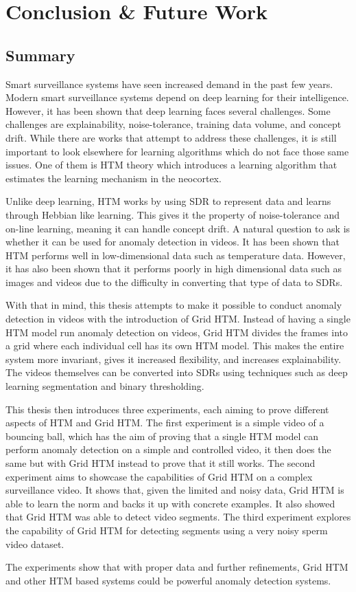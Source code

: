 \chapter{Conclusion \& Future Work}
\label{sec:conclusion}
\section{Summary}
Smart surveillance systems have seen increased demand in the past few years. Modern smart surveillance systems depend on deep learning for their intelligence. However, it has been shown that deep learning faces several challenges. Some challenges are explainability, noise-tolerance, training data volume, and concept drift. While there are works that attempt to address these challenges, it is still important to look elsewhere for learning algorithms which do not face those same issues. One of them is HTM theory which introduces a learning algorithm that estimates the learning mechanism in the neocortex.
\par
Unlike deep learning, HTM works by using SDR to represent data and learns through Hebbian like learning. This gives it the property of noise-tolerance and on-line learning, meaning it can handle concept drift. A natural question to ask is whether it can be used for anomaly detection in videos. It has been shown that HTM performs well in low-dimensional data such as temperature data. However, it has also been shown that it performs poorly in high dimensional data such as images and videos due to the difficulty in converting that type of data to SDRs.
\par
With that in mind, this thesis attempts to make it possible to conduct anomaly detection in videos with the introduction of Grid HTM. Instead of having a single HTM model run anomaly detection on videos, Grid HTM divides the frames into a grid where each individual cell has its own HTM model. This makes the entire system more invariant, gives it increased flexibility, and increases explainability. The videos themselves can be converted into SDRs using techniques such as deep learning segmentation and binary thresholding.
\par
This thesis then introduces three experiments, each aiming to prove different aspects of HTM and Grid HTM. The first experiment is a simple video of a bouncing ball, which has the aim of proving that a single HTM model can perform anomaly detection on a simple and controlled video, it then does the same but with Grid HTM instead to prove that it still works. The second experiment aims to showcase the capabilities of Grid HTM on a complex surveillance video. It shows that, given the limited and noisy data, Grid HTM is able to learn the norm and backs it up with concrete examples. It also showed that Grid HTM was able to detect video segments. The third experiment explores the capability of Grid HTM for detecting segments using a very noisy sperm video dataset.
\par
The experiments show that with proper data and further refinements, Grid HTM and other HTM based systems could be powerful anomaly detection systems.
